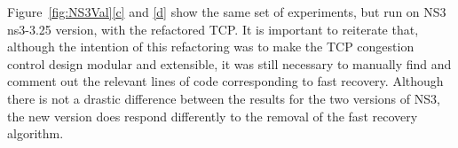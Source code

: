 \documentclass[conference]{IEEEtran}
\begin{document}
Figure~\ref{fig:NS3Val}\ref{c} and \ref{d} show the same set of experiments, but run on NS3 ns3-3.25 version, with the refactored TCP. It is important to reiterate that, although the intention of this refactoring was to make the TCP congestion control design modular and extensible, it was still necessary to manually find and comment out the relevant lines of code corresponding to fast recovery. Although there is not a drastic difference between the results for the two versions of NS3, the new version does respond differently to the removal of the fast recovery algorithm. %

\end{document}
